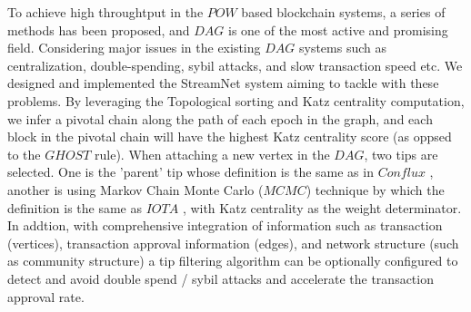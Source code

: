 To achieve high throughtput in the $POW$ based blockchain systems, a series of methods has been proposed, and $DAG$ is one of the most active and promising field.
Considering major issues in the existing $DAG$ systems such as centralization,
double-spending, sybil attacks, and slow transaction speed etc. 
We designed and implemented the StreamNet system aiming to tackle with these problems. 
By leveraging the Topological sorting and Katz centrality computation, 
we infer a pivotal chain along the path of each epoch in the graph,
and each block in the pivotal chain will have the highest Katz centrality score (as oppsed to the $GHOST$ rule).
When attaching a new vertex in the $DAG$, two tips are selected. 
One is the 'parent' tip whose definition is the same as in $Conflux$ \cite{li2018scaling},
another is using Markov Chain Monte Carlo ($MCMC$) technique by which the definition is the same as $IOTA$ \cite{popov2016tangle},
with Katz centrality as the weight determinator. 
In addtion, with comprehensive integration of information such as transaction (vertices), 
transaction approval information (edges), and network structure (such as community structure) 
a tip filtering algorithm can be optionally configured to detect and avoid double spend / sybil attacks and accelerate the transaction approval rate.
